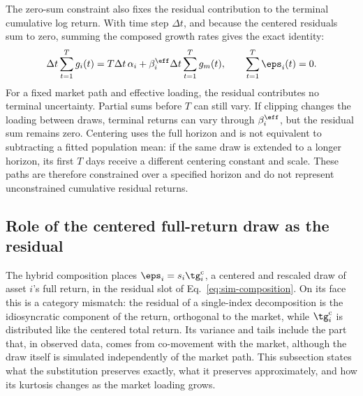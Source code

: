 The zero-sum constraint also fixes the residual contribution to the
terminal cumulative log return. With time step $\Delta t$, and because
the centered residuals sum to zero, summing the composed growth rates
gives the exact identity:
\begin{equation}
  \Delta t\sum_{t=1}^{T} g_i(t)
  = T\Delta t\,\alpha_i
    + \beta_i^{\eff}\Delta t\sum_{t=1}^{T}g_m(t),
  \qquad \sum_{t=1}^{T}\eps_i(t)=0.
  \label{eq:supp-zero-sum-terminal}
\end{equation}
For a fixed market path and effective loading, the residual contributes
no terminal uncertainty. Partial sums before $T$ can still vary. If
clipping changes the loading between draws, terminal returns can vary
through $\beta_i^{\eff}$, but the residual sum remains zero. Centering
uses the full horizon and is not equivalent to subtracting a fitted
population mean: if the same draw is extended to a longer horizon, its
first $T$ days receive a different centering constant and scale. These
paths are therefore constrained over a specified horizon and do not
represent unconstrained cumulative residual returns.

\subsection{Role of the centered full-return draw as the residual}
\label{sec:supp-residual-choice}

The hybrid composition places $\eps_i = s_i \tg_i^{\mathrm c}$, a
centered and rescaled draw of asset $i$'s full return, in the residual
slot of Eq.~\eqref{eq:sim-composition}. On its face this is a category
mismatch: the residual of a single-index decomposition is the
idiosyncratic component of the return, orthogonal to the market, while
$\tg_i^{\mathrm c}$ is distributed like the centered total return. Its
variance and tails include the part that, in observed data, comes
from co-movement with the market, although the draw itself is
simulated independently of the market path. This subsection states
what the substitution preserves exactly, what it preserves
approximately, and how its kurtosis changes as the market loading
grows.

